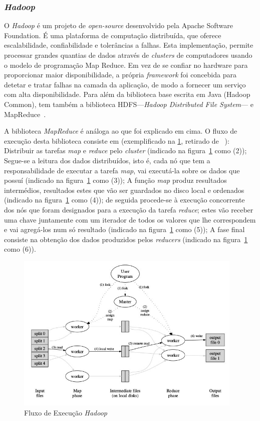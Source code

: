 \subsubsection{\textit{Hadoop}}
\label{hadoop_framework}
O \textit{Hadoop} é um projeto de \textit{open-source} desenvolvido pela Apache Software Foundation. É uma plataforma de computação distribuída, que oferece escalabilidade, confiabilidade e tolerâncias a falhas. Esta implementação, permite processar grandes quantias de dados através de \textit{clusters} de computadores usando o modelo de programação Map Reduce. Em vez de se confiar no hardware para proporcionar maior disponibilidade, a própria \textit{framework} foi concebida para detetar e tratar falhas na camada da aplicação, de modo a fornecer um serviço com alta disponibilidade. Para além da biblioteca base escrita em Java (Hadoop Common), tem também a biblioteca HDFS---\textit{Hadoop Distributed File System}--- e MapReduce~\cite{lin2010data}.

A biblioteca \textit{MapReduce} é análoga ao que foi explicado em cima. O fluxo de execução desta biblioteca consiste em (exemplificado na \ref{fig:fluxo_execucao}, retirado de ~\cite{dean2008mapreduce}): Distribuir as tarefas \textit{map} e \textit{reduce} pelo \textit{cluster} (indicado na figura~\ref{fig:fluxo_execucao} como (2)); Segue-se a leitura dos dados distribuídos, isto é, cada nó que tem a responsabilidade de executar a tarefa \textit{map}, vai executá-la sobre os dados que possuí (indicado na figura~\ref{fig:fluxo_execucao} como (3)); A função \textit{map} produz resultados intermédios, resultados estes que vão ser guardados no disco local e ordenados (indicado na figura~\ref{fig:fluxo_execucao} como (4)); de seguida procede-se à execução concorrente dos nós que foram designados para a execução da tarefa \textit{reduce}; estes vão receber uma chave juntamente com um iterador de todos os valores que lhe correspondem e vai agregá-los num só resultado (indicado na figura~\ref{fig:fluxo_execucao} como (5)); A fase final consiste na obtenção dos dados produzidos pelos \textit{reducers} (indicado na figura~\ref{fig:fluxo_execucao} como (6)).

\begin{figure}[htbp]
	\centering
	\includegraphics[height=3in]{LaTeX/Chapters/Figures/MapReduceExecutionFlow.jpg}
  \caption{Fluxo de Execução \textit{Hadoop}}
  \label{fig:fluxo_execucao}
\end{figure}


